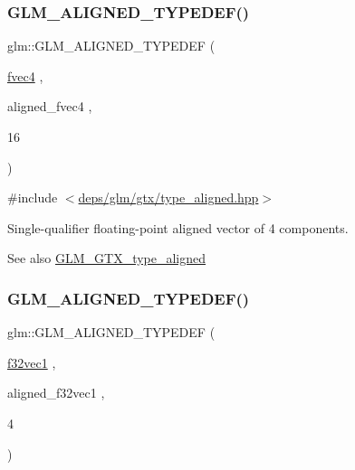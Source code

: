 \subsubsection{\texorpdfstring{G\+L\+M\+\_\+\+A\+L\+I\+G\+N\+E\+D\+\_\+\+T\+Y\+P\+E\+D\+E\+F()}{GLM\_ALIGNED\_TYPEDEF()}\hspace{0.1cm}{\footnotesize\ttfamily [150/209]}}
{\footnotesize\ttfamily glm\+::\+G\+L\+M\+\_\+\+A\+L\+I\+G\+N\+E\+D\+\_\+\+T\+Y\+P\+E\+D\+EF (\begin{DoxyParamCaption}\item[{\hyperlink{group__gtc__type__precision_ga0319cdd208269c180e326b243e2e84e4}{fvec4}}]{,  }\item[{aligned\+\_\+fvec4}]{,  }\item[{16}]{ }\end{DoxyParamCaption})}



{\ttfamily \#include $<$\hyperlink{gtx_2type__aligned_8hpp}{deps/glm/gtx/type\+\_\+aligned.\+hpp}$>$}

Single-\/qualifier floating-\/point aligned vector of 4 components. \begin{DoxySeeAlso}{See also}
\hyperlink{group__gtx__type__aligned}{G\+L\+M\+\_\+\+G\+T\+X\+\_\+type\+\_\+aligned} 
\end{DoxySeeAlso}
\mbox{\label{group__gtx__type__aligned_ga309f495a1d6b75ddf195b674b65cb1e4}} 
\subsubsection{\texorpdfstring{G\+L\+M\+\_\+\+A\+L\+I\+G\+N\+E\+D\+\_\+\+T\+Y\+P\+E\+D\+E\+F()}{GLM\_ALIGNED\_TYPEDEF()}\hspace{0.1cm}{\footnotesize\ttfamily [151/209]}}
{\footnotesize\ttfamily glm\+::\+G\+L\+M\+\_\+\+A\+L\+I\+G\+N\+E\+D\+\_\+\+T\+Y\+P\+E\+D\+EF (\begin{DoxyParamCaption}\item[{\hyperlink{group__gtc__type__precision_ga27d40e360fd5b6ad39ca34ded8210b53}{f32vec1}}]{,  }\item[{aligned\+\_\+f32vec1}]{,  }\item[{4}]{ }\end{DoxyParamCaption})}



